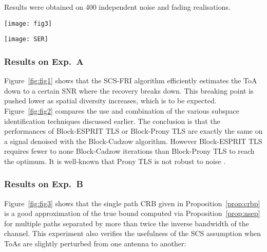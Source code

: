\documentclass[journal,10pt]{IEEEtran}
\providecommand{\xp}[1]{\textsf{Exp.~{#1}}\ }
\begin{document}
Results were obtained on 400 independent noise and fading realisations.
\begin{figure*}[ht!]
  \centering
\texttt{[image: fig3]}
\caption{ (\xp B) This figure shows that the proposed algorithms behave as expected in the presence of ToA mismatches between antennas. Part (b) motivates the separability assumption to compute the CRB of paths located more than  apart, while Part (a) shows its inadequacy for a smaller delay . The ``true'' estimate is obtained via Monte-Carlo simulations.}
\label{fig:fig3}
\end{figure*}

\begin{figure*}[ht!]
  \centering
\texttt{[image: SER]}
\caption{ (\xp C) Using the SCS property, the SER is decreased by a factor  above dB of SNR compared to the conventional non-parametric approach. Sparsity alone provides a significant SER improvement, which shall be combined with the common support property below dB of SNR. At very high SNR, independent channel estimation across antennas become preferable as the channels only approximately have the common support property. However, below dB of SNR the effect of this approximation are undetectable. Another advantage of SCS-FRI is the reduction of pilots, it allows to halve their number while retaining performances superior to lowpass interpolation.}
\label{fig:fig4}
\end{figure*}
\subsubsection{Results on \xp A}
Figure~\ref{fig:fig1} shows that the SCS-FRI algorithm efficiently estimates the ToA down to a certain SNR where the recovery breaks down. This breaking point is pushed lower as spatial diversity increases, which is to be expected. Figure~\ref{fig:fig2} compares the use and combination of the various subspace identification techniques discussed earlier. The conclusion is that the performances of Block-ESPRIT TLS or Block-Prony TLS are exactly the same on a signal denoised with the Block-Cadzow algorithm. However Block-ESPRIT TLS requires fewer to none Block-Cadzow iterations than Block-Prony TLS to reach the optimum. It is well-known that Prony TLS is not robust to noise \cite{Blu2008,Tufts1982}.
\subsubsection{Results on \xp B}
Figure~\ref{fig:fig3} shows that the single path CRB given in Proposition~\ref{prop:crbp} is a good approximation of the true bound computed via Proposition~\ref{prop:nsep} for multiple paths separated by more than twice the inverse bandwidth of the channel. This experiment also verifies the usefulness of the SCS assumption when ToAs are slightly perturbed from one antenna to another: 
\end{document}
